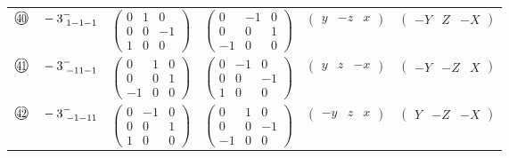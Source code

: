 \documentclass[fleqn,10pt,landscape]{jsarticle}
\begin{document}
\begin{center}
\begin{longtable}{lcccc}
$ {\ooalign{\hfil\resizebox{.8\width}{\height}{40}\hfil\crcr\raise.1ex\hbox{\large$\bigcirc$}}}\quad -3^{-}_{\,\,1-1-1} $ & $ \begin{pmatrix} 0 & 1 & 0 \\ 0 & 0 & -1 \\ 1 & 0 & 0 \end{pmatrix} $ & $ \begin{pmatrix} 0 & -1 & 0 \\ 0 & 0 & 1 \\ -1 & 0 & 0 \end{pmatrix} $ & $ \begin{pmatrix} y & - z & x \end{pmatrix} $ & $ \begin{pmatrix} - Y & Z & - X \end{pmatrix} $ \\
$ {\ooalign{\hfil\resizebox{.8\width}{\height}{41}\hfil\crcr\raise.1ex\hbox{\large$\bigcirc$}}}\quad -3^{-}_{\,\,-11-1} $ & $ \begin{pmatrix} 0 & 1 & 0 \\ 0 & 0 & 1 \\ -1 & 0 & 0 \end{pmatrix} $ & $ \begin{pmatrix} 0 & -1 & 0 \\ 0 & 0 & -1 \\ 1 & 0 & 0 \end{pmatrix} $ & $ \begin{pmatrix} y & z & - x \end{pmatrix} $ & $ \begin{pmatrix} - Y & - Z & X \end{pmatrix} $ \\
$ {\ooalign{\hfil\resizebox{.8\width}{\height}{42}\hfil\crcr\raise.1ex\hbox{\large$\bigcirc$}}}\quad -3^{-}_{\,\,-1-11} $ & $ \begin{pmatrix} 0 & -1 & 0 \\ 0 & 0 & 1 \\ 1 & 0 & 0 \end{pmatrix} $ & $ \begin{pmatrix} 0 & 1 & 0 \\ 0 & 0 & -1 \\ -1 & 0 & 0 \end{pmatrix} $ & $ \begin{pmatrix} - y & z & x \end{pmatrix} $ & $ \begin{pmatrix} Y & - Z & - X \end{pmatrix} $ \\

\end{longtable}
\end{center}
\end{document}
